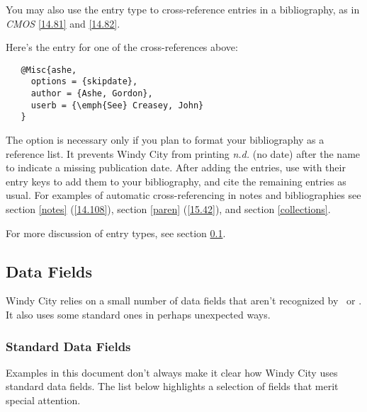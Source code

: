 \documentclass[11pt,letterpaper,oneside]{article}
\begin{document}
You may also use the  entry type to cross-reference
entries in a bibliography, as in \textit{CMOS} \ref{14.81} and
\ref{14.82}.

\begin{bibonly}
\nocite{ashe,creasey1976,creasey1978,creasey1966,morton,york}
\end{bibonly}

\noindent Here's the  entry for one of the
cross-references above:

\begin{verbatim}
   @Misc{ashe,
     options = {skipdate},
     author = {Ashe, Gordon},
     userb = {\emph{See} Creasey, John}
   }
\end{verbatim}

\noindent The option  is necessary only if you plan to
format your bibliography as a reference list. It prevents Windy City
from printing \textit{n.d.} (no date) after the name to indicate a
missing publication date. After adding the  entries, use
 with their entry keys to add them to your bibliography,
and cite the remaining entries as usual. For examples of automatic
cross-referencing in notes and bibliographies see section \ref{notes}
(\ref{14.108}), section \ref{paren} (\ref{15.42}), and section
\ref{collections}.

For more discussion of entry types, see section \ref{datafields}.

\subsection{Data Fields}
\label{datafields}

Windy City relies on a small number of data fields that aren't
recognized by \BibTeX\ or \biblatex. It also uses some standard ones
in perhaps unexpected ways.

\subsubsection{Standard Data Fields}
\label{stdfields}

Examples in this document don't always make it clear how Windy City
uses standard data fields. The list below highlights a selection of
fields that merit special attention.
\end{document}
